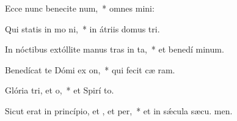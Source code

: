 \item Ecce nunc benecite num,~* omnes  mini:
\item Qui statis in mo ni,~* in átriis domus  tri.
\item In nóctibus extóllite manus tras in ta,~* et benedí minum.
\item Benedícat te Dómi ex on,~* qui fecit cæ  ram.
\item Glória tri, et o,~* et Spirí to.
\item Sicut erat in princípio, et , et per,~* et in sǽcula sæcu. men.
